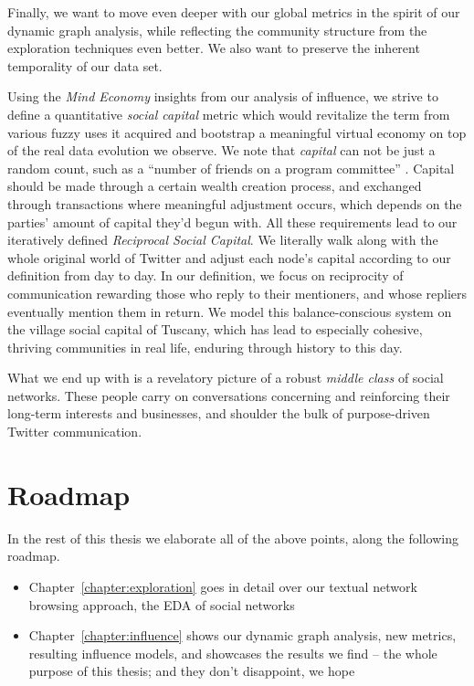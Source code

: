 \documentclass[10pt,oneside]{memoir}
\begin{document}
\begin{Spacing}{2}
Finally, we want to move even deeper with our global metrics in the spirit of our dynamic graph analysis, while reflecting the community structure from the exploration techniques even better.  We also want to preserve the inherent temporality of our data set.


Using the {\itshape Mind Economy} insights from our analysis of influence, we strive to define a quantitative {\itshape social capital} metric which would revitalize the term from various fuzzy uses it acquired and bootstrap a meaningful virtual economy on top of the real data evolution we observe.  We note that {\itshape capital} can not be just a random count, such as a ``number of friends on a program committee'' \cite{Licamele:2005:Benefit}.  Capital should be made through a certain wealth creation process, and exchanged through transactions where meaningful adjustment occurs, which depends on the parties' amount of capital they'd begun with.  All these requirements lead to our iteratively defined {\itshape Reciprocal Social Capital}.  We literally walk along with the whole original world of Twitter and adjust each node's capital according to our definition from day to day.  In our definition, we focus on reciprocity of communication rewarding those who reply to their mentioners, and whose repliers eventually mention them in return.  We model this balance-conscious system on the village social capital of Tuscany, which has lead to especially cohesive, thriving communities in real life, enduring through history to this day.


What we end up with is a revelatory picture of a robust {\itshape middle class} of social networks.  These people carry on conversations concerning and reinforcing their long-term interests and businesses, and shoulder the bulk of purpose-driven Twitter communication.


\pagebreak \section{Roadmap}
\label{roadmap}

In the rest of this thesis we elaborate all of the above points, along the following roadmap.


\begin{itemize}


\item Chapter~\ref{chapter:exploration} goes in detail over our textual network browsing approach, the EDA of social networks

\item Chapter~\ref{chapter:influence} shows our dynamic graph analysis, new metrics, resulting influence models, and showcases the results we find -- the whole purpose of this thesis; and they don't disappoint, we hope


\end{itemize}
\end{Spacing}
\end{document}
